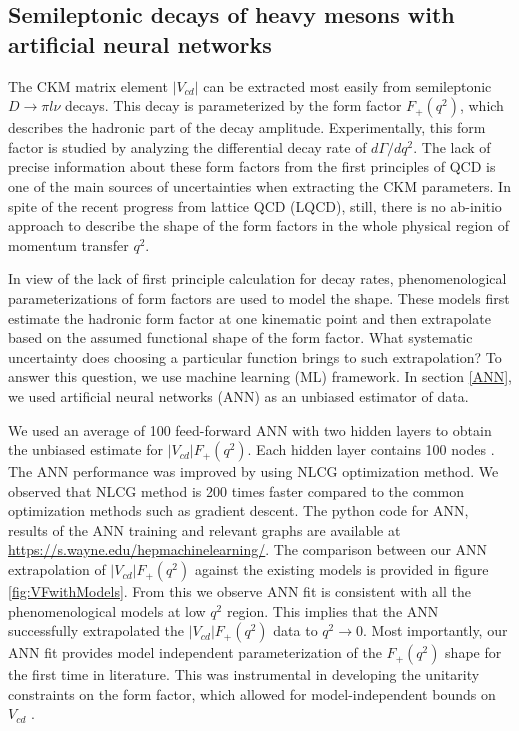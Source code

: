 \subsection{Semileptonic decays of heavy mesons with artificial neural networks}
The CKM matrix element $|V_{cd}|$ can be extracted most easily from semileptonic $D\rightarrow\pi l\nu$ decays. This decay is parameterized by the form factor $F_{+}(q^2)$, which describes the hadronic part of the decay amplitude. Experimentally, this form factor is studied by analyzing the differential decay rate of $d\Gamma/dq^2$. The lack of precise information about these form factors from the first principles of QCD is one of the main sources of uncertainties when extracting the CKM parameters. In spite of the recent progress from lattice QCD (LQCD), still, there is no ab-initio approach to describe the shape of the form factors in the whole physical region of momentum transfer $q^2$.\par
In view of the lack of first principle calculation for decay rates,  phenomenological parameterizations of form factors are used to model the shape. These models first estimate the hadronic form factor at one kinematic point and then extrapolate based on the assumed functional shape of the form factor. What systematic uncertainty does choosing a particular function brings to such extrapolation? To answer this question, we use machine learning (ML) framework. In section \ref{ANN}, we used artificial neural networks (ANN) as an unbiased estimator of data.\par 
We used an average of 100 feed-forward ANN with two hidden layers to obtain the unbiased estimate for $|V_{cd}|F_{+}(q^2)$. Each hidden layer contains 100 nodes \cite{Grant:2019yar}. The ANN performance was improved by using NLCG optimization method. We observed that NLCG method is 200 times faster compared to the common optimization methods such as gradient descent. The python code for ANN, results of the ANN training and relevant graphs are available at \url{https://s.wayne.edu/hepmachinelearning/}. The comparison between our ANN extrapolation of $|V_{cd}|F_{+}(q^2)$ against the existing models is provided in figure \ref{fig:VFwithModels}. From this we observe ANN fit is consistent with all the phenomenological models at low $q^2$ region. This implies that the ANN successfully extrapolated the $|V_{cd}|F_{+}(q^2)$ data to $q^2\to 0$.
 Most importantly, our ANN fit provides model independent parameterization of the $F_+(q^2)$ shape for the first time in literature. This was instrumental in developing the unitarity constraints on the form factor, which allowed for model-independent bounds on $V_{cd}$ \cite{Grant:2019yar}. 
